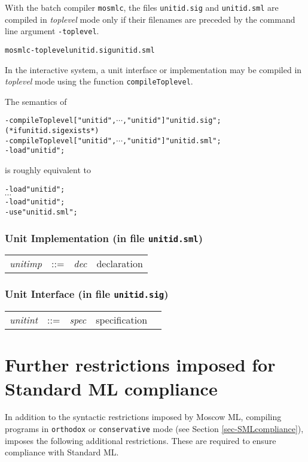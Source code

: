 \documentclass[fleqn]{article}
\def\allttcdots{\ensuremath{\cdots}}
\begin{document}
With the batch compiler {\tt mosmlc},
the files {\tt unitid.sig} and {\tt unitid.sml} are compiled in \emph{toplevel} mode only if their filenames are preceded by the command line argument {\tt -toplevel}.

\begin{alltt}
mosmlc -toplevel unitid.sig unitid.sml
\end{alltt}

In the interactive system, a unit interface or implementation may
be compiled in \emph{toplevel} mode using the function
{\tt compileToplevel}.

The semantics of
\begin{alltt}
- compileToplevel ["unitid\et",\allttcdots,"unitid\n"] "unitid.sig"; (* if unitid.sig exists *) 
- compileToplevel ["unitid\et",\allttcdots,"unitid\n"] "unitid.sml";
- load "unitid";
\end{alltt}
is roughly equivalent to
\begin{alltt}
- load "unitid\et";
\allttcdots
- load "unitid\n";
- use "unitid.sml";
\end{alltt}

\subsubsection*{Unit Implementation (in file {\tt unitid.sml})}

\begin{tabular}{llll}
{\it unitimp\/} & ::= & {\it dec\/} & declaration \\
\end{tabular}

\subsubsection*{Unit Interface (in file {\tt unitid.sig})}

\begin{tabular}{lllll}
{\it unitint\/} & ::=   & {\it spec\/} & specification \\
\end{tabular}

\newpage

\section{Further restrictions imposed for Standard ML compliance}\label{sec-SMLrestrictions}

In addition to the syntactic restrictions imposed by Moscow ML,
compiling programs in {\tt orthodox} or {\tt conservative} mode (see Section
\ref{sec-SMLcompliance}),
imposes the following additional restrictions. These
are required to ensure compliance with Standard ML.
\end{document}
